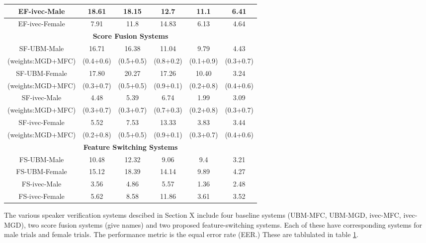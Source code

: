 \documentclass{article}
\begin{document}
\begin{table}[h]
\begin{tabular}{|c|c|c|c|c|c|}
{EF-ivec-Male} & 18.61 & 18.15 & 12.7 & 11.1 & 6.41 \\ \hline

{EF-ivec-Female} & 7.91 & 11.8 & 14.83 & 6.13 & 4.64 \\ \hline 

\multicolumn{6}{|c|}{\bf Score Fusion Systems} \\ \hline

SF-UBM-Male & 16.71 & 16.38 & 11.04 & 9.79 & 4.43 \\ 
(weights:MGD+MFC) & (0.4+0.6) & (0.5+0.5) & (0.8+0.2) & (0.1+0.9) & (0.3+0.7) \\ \hline

SF-UBM-Female & 17.80 & 20.27 & 17.26 & 10.40 & 3.24 \\ 
(weights:MGD+MFC) & (0.3+0.7) & (0.5+0.5) & (0.9+0.1) & (0.2+0.8) & (0.4+0.6) \\ \hline

SF-ivec-Male & 4.48 & 5.39 & 6.74 & 1.99 & 3.09 \\ 
(weights:MGD+MFC) & (0.3+0.7) & (0.3+0.7) & (0.7+0.3) & (0.2+0.8) & (0.3+0.7) \\ \hline

SF-ivec-Female & 5.52 & 7.53 & 13.33 & 3.83 & 3.44 \\ 
(weights:MGD+MFC) & (0.2+0.8) & (0.5+0.5) & (0.9+0.1) & (0.3+0.7) & (0.4+0.6) \\ \hline

\multicolumn{6}{|c|}{\bf Feature Switching Systems} \\ \hline

{FS-UBM-Male} & {10.48} & {12.32} & {9.06} & {9.4} & {3.21} \\  \hline

{FS-UBM-Female} & {15.12 } & {18.39} & {14.14} & {9.89} & {4.27} \\ \hline

{FS-ivec-Male} & {3.56} & {4.86} & {5.57} & {1.36} & {2.48} \\ \hline

{FS-ivec-Female} & {5.62} & {8.58} & 11.86 & {3.61} & {3.52} \\ \hline

	\end{tabular}
	\label{tab:eer}
	\end{table}


The various speaker verification systems descibed in Section X include four
baseline systems (UBM-MFC, UBM-MGD, ivec-MFC, ivec-MGD), two score fusion systems (give names) and
two proposed feature-switching systems. Each of these have corresponding systems
for male trials and female trials. The performance metric is the equal error
rate (EER.) These are tablulated in table \ref{tab:eer}.
\end{document}
